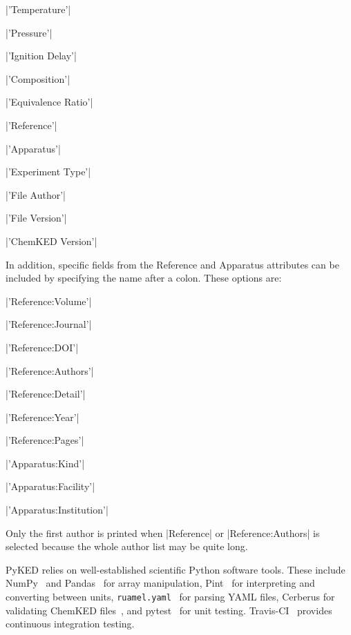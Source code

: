 \documentclass[12pt]{ussci}
\newcommand\ck{ChemKED}
\newcommand\pk{PyKED}
\begin{document}
\noindent\begin{itemize*}
    \item \python|'Temperature'|
    \item \python|'Pressure'|
    \item \python|'Ignition Delay'|
    \item \python|'Composition'|
    \item \python|'Equivalence Ratio'|
    \item \python|'Reference'|
    \item \python|'Apparatus'|
    \item \python|'Experiment Type'|
    \item \python|'File Author'|
    \item \python|'File Version'|
    \item \python|'ChemKED Version'|
\end{itemize*}

In addition, specific fields from the Reference and Apparatus attributes can
be included by specifying the name after a colon. These options are:

\noindent\begin{itemize*}
    \item \python|'Reference:Volume'|
    \item \python|'Reference:Journal'|
    \item \python|'Reference:DOI'|
    \item \python|'Reference:Authors'|
    \item \python|'Reference:Detail'|
    \item \python|'Reference:Year'|
    \item \python|'Reference:Pages'|
    \item \python|'Apparatus:Kind'|
\end{itemize*}

\noindent\begin{itemize*}
    \item \python|'Apparatus:Facility'|
    \item \python|'Apparatus:Institution'|
\end{itemize*}

Only the first author is printed when \python|Reference| or
\python|Reference:Authors| is selected because the whole author list may be
quite long.

\pk{} relies on well-established scientific Python software tools. These include
NumPy~\autocite{vanderWalt:2011np} and Pandas~\autocite{pandas,McKinney2010} for
array manipulation, Pint~\autocite{Grecco2016} for interpreting and converting
between units, \texttt{ruamel.yaml}~\autocite{ruamel_yaml} for parsing YAML
files, Cerberus for validating \ck{} files~\autocite{cerberus}, and
pytest~\autocite{pytest:3.0.1} for unit testing. Travis-CI~\autocite{Travis2016}
provides continuous integration testing.
\end{document}
